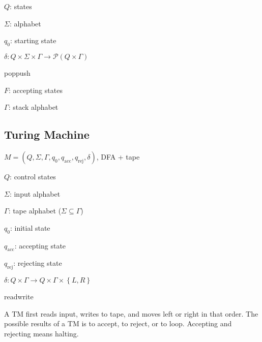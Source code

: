 \hspace{5mm}$Q$: states

\hspace{5mm}$\Sigma$: alphabet

\hspace{5mm}$q_0$: starting state

\hspace{5mm}$\delta: Q\times\Sigma\times\Gamma \to \mathcal{P}(Q\times\Gamma)$

\hspace{5mm}\hspace{9mm}pop\hspace{6.8mm}push

\hspace{5mm}$F$: accepting states

\hspace{5mm}$\Gamma$: stack alphabet
\subsection{Turing Machine}
$M = (Q, \Sigma, \Gamma, q_0, q_\mathrm{acc}, q_\mathrm{rej}, \delta)$, DFA + tape

\hspace{5mm}$Q$: control states

\hspace{5mm}$\Sigma$: input alphabet

\hspace{5mm}$\Gamma$: tape alphabet ($\Sigma\subseteq\Gamma$)

\hspace{5mm}$q_0$: initial state

\hspace{5mm}$q_\mathrm{acc}$: accepting state

\hspace{5mm}$q_\mathrm{rej}$: rejecting state

\hspace{5mm}$\delta: Q\times\Gamma\to Q\times\Gamma\times\left\{L, R\right\}$

\hspace{5mm}\hspace{2.6mm}read\hspace{11.5mm}write

A TM first reads input, writes to tape, and moves left or right in that
order. The possible results of a TM is to accept, to reject, or to loop.
Accepting and rejecting means halting.

